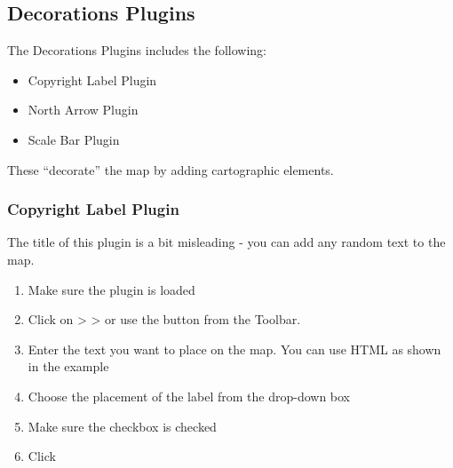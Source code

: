 \subsection{Decorations Plugins}

\updatedisclaimer

The Decorations Plugins includes the following:

\begin{itemize}
\item Copyright Label Plugin
\item North Arrow Plugin
\item Scale Bar Plugin
\end{itemize}
 
These ``decorate'' the map by adding cartographic elements. 

\subsubsection{Copyright Label Plugin}


The title of this plugin is a bit misleading - you can add any random text to the map.

\begin{enumerate}
\item Make sure the plugin is loaded
\item Click on  >  >  or use the  button from the Toolbar.
\item Enter the text you want to place on the map. You can use HTML as
  shown in the example
\item Choose the placement of the label from the  drop-down box
\item Make sure the  checkbox is checked
\item Click  
\end{enumerate}

